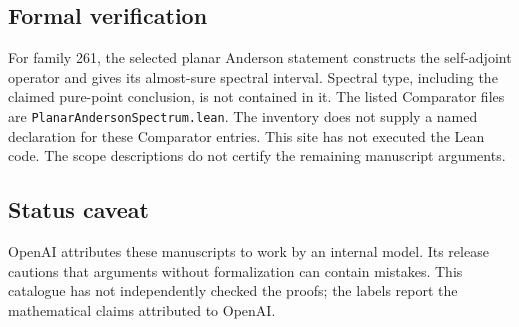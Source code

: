 \documentclass[11pt]{article}
\begin{document}
\subsection{Formal verification}
For family 261, the selected planar Anderson statement constructs the self-adjoint operator and gives its almost-sure spectral interval. Spectral type, including the claimed pure-point conclusion, is not contained in it. The listed Comparator files are \texttt{PlanarAndersonSpectrum.lean}. The inventory does not supply a named declaration for these Comparator entries. This site has not executed the Lean code. The scope descriptions do not certify the remaining manuscript arguments.

\subsection{Status caveat}
OpenAI attributes these manuscripts to work by an internal model. Its release cautions that arguments without formalization can contain mistakes. This catalogue has not independently checked the proofs; the labels report the mathematical claims attributed to OpenAI.
\end{document}
